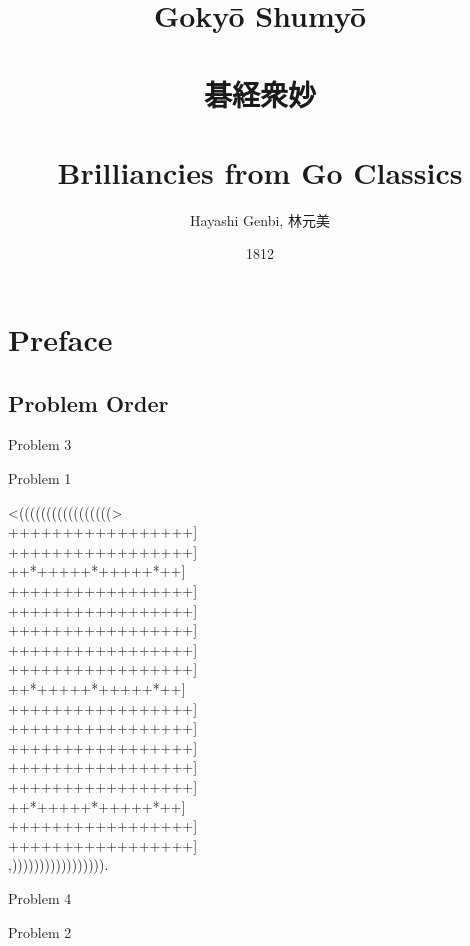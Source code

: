 \documentclass[mcrownvopaper,10pt,onecolumn,final]{memoir}
\title{{\Huge Gokyō Shumyō}\\~\\{\huge 碁経衆妙}\\~\\\large Brilliancies from Go Classics\vspace{10em}}
\author{Hayashi Genbi, 林元美}
\date{1812}
\begin{document}
\maketitle
\newpage
\tableofcontents
\chapter*{Preface}
\begin{figure}
\end{figure}
\section{Problem Order}
\begin{minipage}[c]{0.5\linewidth}
    \hspace{8.3mm}Problem 3
\end{minipage}
\begin{minipage}[c]{0.5\linewidth}
    \hspace{27mm}Problem 1
\end{minipage}
\begin{minipage}[c]{\linewidth}
    \centering
    {\gnos%
    <(((((((((((((((((>\\
    +++++++++++++++++]\\
    +++++++++++++++++]\\
    ++*+++++*+++++*++]\\
    +++++++++++++++++]\\
    +++++++++++++++++]\\
    +++++++++++++++++]\\
    +++++++++++++++++]\\
    +++++++++++++++++]\\
    ++*+++++*+++++*++]\\
    +++++++++++++++++]\\
    +++++++++++++++++]\\
    +++++++++++++++++]\\
    +++++++++++++++++]\\
    +++++++++++++++++]\\
    ++*+++++*+++++*++]\\
    +++++++++++++++++]\\
    +++++++++++++++++]\\
    ,))))))))))))))))).\\
    }
\end{minipage}
\begin{minipage}[c]{0.5\linewidth}
    \hspace{8.3mm}Problem 4
\end{minipage}
\begin{minipage}[c]{0.5\linewidth}
    \hspace{27mm}Problem 2
\end{minipage}
\end{document}
